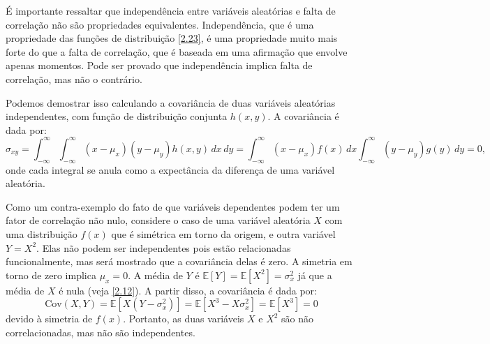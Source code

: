 É importante ressaltar que independência entre variáveis aleatórias e falta de correlação não são propriedades equivalentes. Independência, que é uma propriedade das funções de distribuição \eqref{2.23}, é uma propriedade muito mais forte do que a falta de correlação, que é baseada em uma afirmação que envolve apenas momentos. Pode ser provado que independência implica falta de correlação, mas não o contrário.

Podemos demostrar isso calculando a covariância de duas variáveis aleatórias independentes, com função de distribuição conjunta $h(x, y)$. A covariância é dada por:
\begin{equation*}
 \sigma_{xy} = \int_{-\infty}^{\infty} \int_{-\infty}^{\infty} (x - \mu_x)(y - \mu_y)h(x, y) \, dx \, dy = \int_{-\infty}^{\infty} (x - \mu_x) f(x) \, dx \int_{-\infty}^{\infty} (y - \mu_y) g(y) \, dy = 0,
\end{equation*}
onde cada integral se anula como a expectância da diferença de uma variável aleatória.

Como um contra-exemplo do fato de que variáveis dependentes podem ter um fator de correlação não nulo, considere o caso de uma variável aleatória $X$ com uma distribuição $f(x)$ que é simétrica em torno da origem, e outra variável $Y = X^2$. Elas não podem ser independentes pois estão relacionadas funcionalmente, mas será mostrado que a covariância delas é zero. A simetria em torno de zero implica $\mu_x = 0$. A média de $Y$ é $\mathbb{E}[Y] = \mathbb{E}[X^2] = \sigma_x^2$ já que a média de $X$ é nula (veja \autoref{2.12}). A partir disso, a covariância é dada por:
\begin{equation*}
\text{Cov}(X, Y) = \mathbb{E}[X(Y - \sigma_x^2)] = \mathbb{E}[X^3 - X \sigma_x^2] = \mathbb{E}[X^3] = 0 
\end{equation*}
devido à simetria de $f(x)$. Portanto, as duas variáveis $X$ e $X^2$ são não correlacionadas, mas não são independentes.

